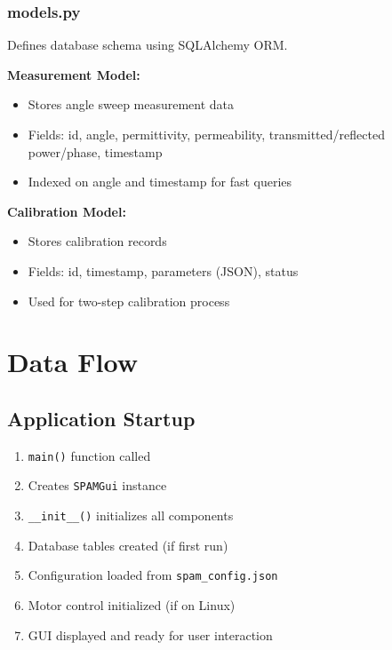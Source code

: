 \documentclass[11pt,a4paper]{article}
\begin{document}
\subsubsection{models.py}
Defines database schema using SQLAlchemy ORM.

\textbf{Measurement Model:}
\begin{itemize}
    \item Stores angle sweep measurement data
    \item Fields: id, angle, permittivity, permeability, transmitted/reflected power/phase, timestamp
    \item Indexed on angle and timestamp for fast queries
\end{itemize}

\textbf{Calibration Model:}
\begin{itemize}
    \item Stores calibration records
    \item Fields: id, timestamp, parameters (JSON), status
    \item Used for two-step calibration process
\end{itemize}

\section{Data Flow}

\subsection{Application Startup}
\begin{enumerate}
    \item \texttt{main()} function called
    \item Creates \texttt{SPAMGui} instance
    \item \texttt{\_\_init\_\_()} initializes all components
    \item Database tables created (if first run)
    \item Configuration loaded from \texttt{spam\_config.json}
    \item Motor control initialized (if on Linux)
    \item GUI displayed and ready for user interaction
\end{enumerate}
\end{document}

